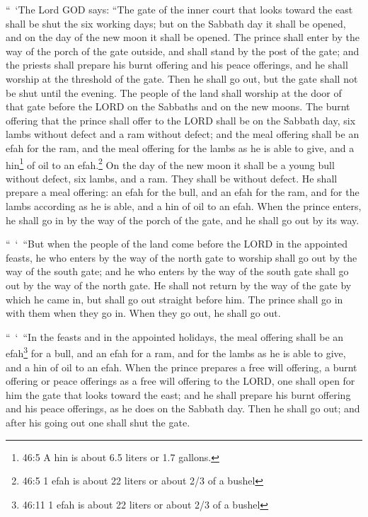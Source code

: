 \mychapter{} \myverse*{}“ ‘The Lord GOD says: “The gate of the inner court that looks toward
the east shall be shut the six working days; but on the Sabbath day it shall be opened, and on the day
of the new moon it shall be opened.
\myverse{}The prince shall enter by the way of the porch of the gate outside, and shall
stand by the post of the gate; and the priests shall prepare his burnt offering and his peace offerings,
and he shall worship at the threshold of the gate. Then he shall go out, but the gate shall not be shut
until the evening.
\myverse{}The people of the land shall worship at the door of that gate before the LORD
on the Sabbaths and on the new moons.
\myverse{}The burnt offering that the prince shall offer to the LORD shall be on the
Sabbath day, six lambs without defect and a ram without defect;
\myverse{}and the meal offering shall be an efah for the ram, and the meal offering for
the lambs as he is able to give, and a hin\footnote{46:5 A hin is about 6.5 liters or 1.7 gallons.} of oil to an efah.\footnote{46:5 1 efah is about 22 liters or about 2/3 of a bushel}
\myverse{}On the day of the new moon it shall be a young bull without defect, six lambs,
and a ram. They shall be without defect.
\myverse{}He shall prepare a meal offering: an efah for the bull, and an efah for the
ram, and for the lambs according as he is able, and a hin of oil to an efah.
\myverse{}When the prince enters, he shall go in by the way of the porch of the gate,
and he shall go out by its way.

\myverse{}“ ‘ “But when the people of the land come before the LORD in the
appointed feasts, he who enters by the way of the north gate to worship shall go out by the way of the
south gate; and he who enters by the way of the south gate shall go out by the way of the north gate.
He shall not return by the way of the gate by which he came in, but shall go out straight before him.
\myverse{}The prince shall go in with them when they go in. When they go out, he shall
go out.

\myverse{}“ ‘ “In the feasts and in the appointed holidays, the meal offering
shall be an efah\footnote{46:11 1 efah is about 22 liters or about 2/3 of a bushel} for a bull, and an efah for a ram,
and for the lambs as he is able to give, and a hin of oil to an efah.
\myverse{}When the prince prepares a free will offering, a burnt offering or peace
offerings as a free will offering to the LORD, one shall open for him the gate that looks toward the east;
and he shall prepare his burnt offering and his peace offerings, as he does on the Sabbath day. Then he
shall go out; and after his going out one shall shut the gate.

